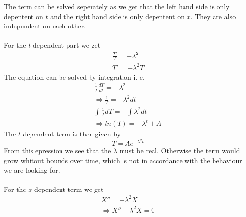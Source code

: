 \documentclass{article}
\begin{document}
The term can be solved seperately as we get that the left hand side is only depentent on $t$ and the right hand side is only depentent on $x$. They are also independent on each other.\\
\\
For the $t$ dependent part we get
\begin{eqnarray}
\frac{T'}{T} = -\lambda^2 \\ 
T' = -\lambda^2 T
\end{eqnarray}
The equation can be solved by integration i. e. 
\begin{subequations}
\begin{eqnarray}
\label{eqn:solvingTdependentTransientTerm1D}
\frac{1}{T}\frac{dT}{dt} = -\lambda^2 \\ 
\Rightarrow \frac{1}{T} = -\lambda^2 dt\\
\int \frac{1}{T}dT = - \int \lambda^2 dt \\
\Rightarrow ln(T) = -\lambda^t + A
\end{eqnarray}
\end{subequations}
The $t$ dependent term is then given by
\begin{equation}
T = Ae^{-\lambda^2 t}
\label{eqn:tdependentTransientTerm1D}
\end{equation}
From this epression we see that the $\lambda$ must be real. Otherwise the term would grow whitout bounds over time, which is not in accordance with the behaviour we are looking for. 
\\
\\
For the $x$ dependent term we get
\begin{subequations}
\begin{eqnarray}
X'' = -\lambda^2 X \\
\Rightarrow X'' + \lambda^2 X = 0 
\end{eqnarray}
\end{subequations}
\end{document}
